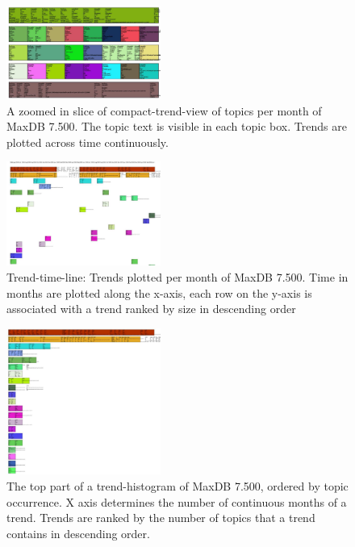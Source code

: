 \documentclass[times, 10pt,twocolumn]{article}
\begin{document}
\begin{figure}[t]
  \centering
  \includegraphics[width=0.45\textwidth]{fixed-time-smear-plot-cropped}
  \caption{A zoomed in slice of compact-trend-view of topics per month of MaxDB 7.500. The topic text is visible in each topic box. Trends are plotted across time continuously.}
  \label{fig:zoomedsmear}
\end{figure}


\begin{figure}
  \centering
  \includegraphics[width=0.45\textwidth]{class-smear-plot-crop-scaled}
  \caption{Trend-time-line: Trends plotted per month of MaxDB 7.500. Time in months are plotted along the x-axis, each row on the y-axis is associated with a trend ranked by size in descending order}         
  \label{fig:trendtimeline}
\end{figure}


\begin{figure}
  \centering
  \includegraphics[width=0.45\textwidth]{histogram-cropped-scaled}
  \caption{The top part of a trend-histogram of MaxDB 7.500, ordered
    by topic occurrence. X axis determines the number of continuous
    months of a trend. Trends are ranked by the number of topics that
    a trend contains in descending order.}
  \label{fig:histogram}
\end{figure}
\end{document}

